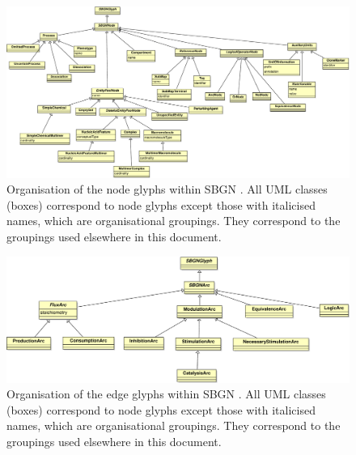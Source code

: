 \begin{figure}[htb]
\begin{center}
\includegraphics[width=\linewidth]{images/build/sbgn_node_taxonomy.pdf}
\caption{Organisation of the node glyphs within SBGN \PDl. All UML classes (boxes) correspond to \PD node glyphs except those with italicised names, which are organisational groupings. They correspond to the groupings used elsewhere in this document.}
\label{fig:sbgn_node_tax}
\end{center}
\end{figure}

\begin{figure}[htb!]
\begin{center}
\includegraphics[width=\linewidth]{images/build/sbgn_edge_taxonomy.pdf}
\caption{Organisation of the edge glyphs within SBGN \PDl. All UML classes (boxes) correspond to \PD node glyphs except those with italicised names, which are organisational groupings. They correspond to the groupings used elsewhere in this document.}
\label{fig:sbgn_edge_tax}
\end{center}
\end{figure}


